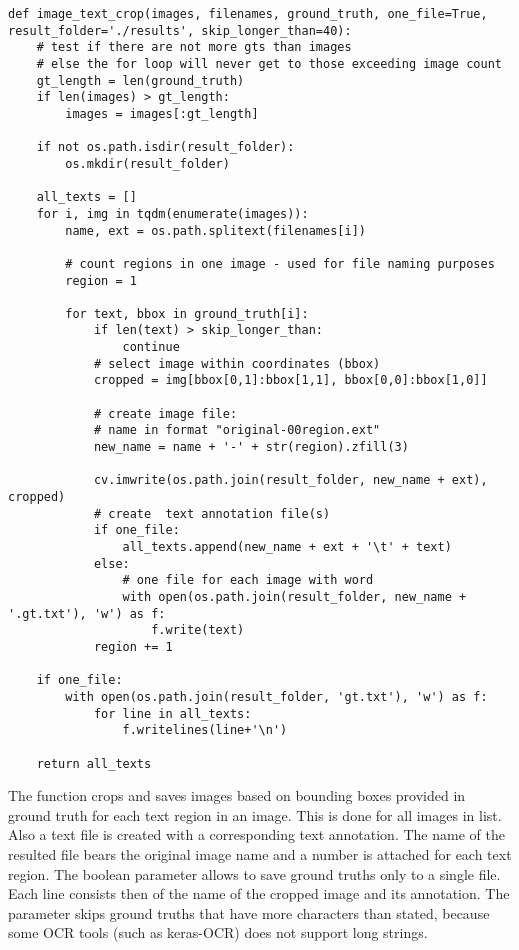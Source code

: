 \begin{lstlisting}[caption=image\_text\_crop]
def image_text_crop(images, filenames, ground_truth, one_file=True, result_folder='./results', skip_longer_than=40):
    # test if there are not more gts than images
    # else the for loop will never get to those exceeding image count
    gt_length = len(ground_truth)
    if len(images) > gt_length:
        images = images[:gt_length]

    if not os.path.isdir(result_folder):
        os.mkdir(result_folder)
    
    all_texts = []
    for i, img in tqdm(enumerate(images)):
        name, ext = os.path.splitext(filenames[i])

        # count regions in one image - used for file naming purposes
        region = 1
        
        for text, bbox in ground_truth[i]:
            if len(text) > skip_longer_than:
                continue
            # select image within coordinates (bbox)
            cropped = img[bbox[0,1]:bbox[1,1], bbox[0,0]:bbox[1,0]]

            # create image file:
            # name in format "original-00region.ext"
            new_name = name + '-' + str(region).zfill(3)

            cv.imwrite(os.path.join(result_folder, new_name + ext), cropped)
            # create  text annotation file(s)
            if one_file:
                all_texts.append(new_name + ext + '\t' + text)
            else:
                # one file for each image with word
                with open(os.path.join(result_folder, new_name + '.gt.txt'), 'w') as f:
                    f.write(text)
            region += 1
    
    if one_file:
        with open(os.path.join(result_folder, 'gt.txt'), 'w') as f:
            for line in all_texts:
                f.writelines(line+'\n')

    return all_texts
\end{lstlisting}

The function  crops and saves images based on bounding boxes provided in ground truth for each text region in an image. This is done for all images in  list. Also a text file is created with a corresponding text annotation. The name of the resulted file bears the original image name and a number is attached for each text region. The boolean parameter  allows to save ground truths only to a single file. Each line consists then of the name of the cropped image and its annotation. The parameter  skips ground truths that have more characters than stated, because some OCR tools (such as keras-OCR) does not support long strings.

